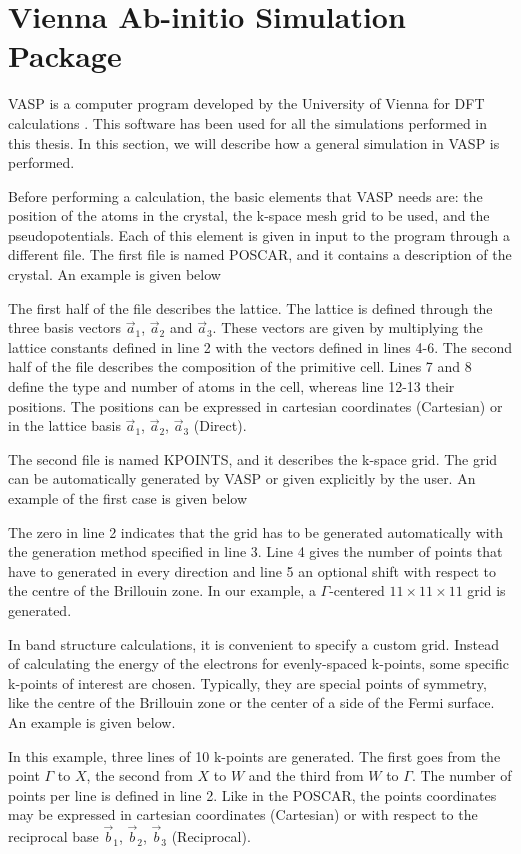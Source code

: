 \section{Vienna Ab-initio Simulation Package}
VASP is a computer program  developed by the University of Vienna for DFT calculations \cite{kresse1993,kresse1996,kresse1996a,kresse1999}. This software has been used for all the simulations performed in this thesis. In this section, we will describe how a general simulation in VASP is performed.

Before performing a calculation, the basic elements that VASP needs are: the position of the atoms in the crystal, the k-space mesh grid to be used, and the pseudopotentials. Each of this element is given in input to the program through a different file. The first file is named POSCAR, and it contains a description of the crystal. An example is given below

The first half of the file describes the lattice. The lattice is defined through the three basis vectors $\vec{a}_1$, $\vec{a}_2$ and $\vec{a}_3$. These vectors are given by multiplying the lattice constants defined in line 2 with the vectors defined in lines 4-6. The second half of the file describes the composition of the primitive cell. Lines 7 and 8 define the type and number of atoms in the cell, whereas line 12-13 their positions. The positions can be expressed in cartesian coordinates (Cartesian) or in the lattice basis $\vec{a}_1$, $\vec{a}_2$, $\vec{a}_3$ (Direct).

The second file is named KPOINTS, and it describes the k-space grid. The grid can be automatically generated by VASP or given explicitly by the user. An example of the first case is given below

The zero in line 2 indicates that the grid has to be generated automatically with the generation method specified in line 3. Line 4 gives the number of points that have to generated in every direction and line 5 an optional shift with respect to the centre of the Brillouin zone. In our example, a $\Gamma$-centered $11\times11\times11$ grid is generated.

In band structure calculations, it is convenient to specify a custom grid. Instead of calculating the energy of the electrons for evenly-spaced k-points, some specific k-points of interest are chosen. Typically, they are special points of symmetry, like the centre of the Brillouin zone or the center of a side of the Fermi surface. An example is given below.

In this example, three lines of 10 k-points are generated. The first goes from the point $\Gamma$ to $X$, the second from $X$ to $W$ and the third from $W$ to $\Gamma$. The number of points per line is defined in line 2. Like in the POSCAR, the points coordinates may be expressed in cartesian coordinates (Cartesian) or with respect to the reciprocal base $\vec{b}_1$, $\vec{b}_2$, $\vec{b}_3$ (Reciprocal).

